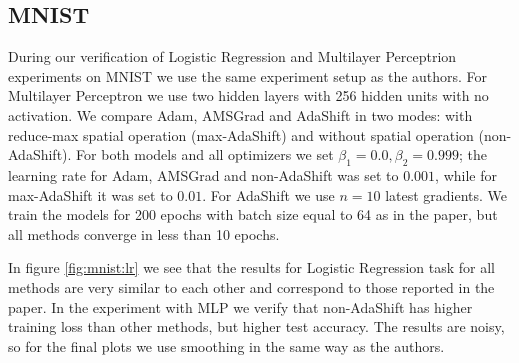 \documentclass{article} %
\begin{document}
\subsection{MNIST}
During our verification of Logistic Regression and
Multilayer Perceptrion experiments on MNIST we use the
same experiment setup as the authors.
For Multilayer Perceptron we use two hidden layers with 256 hidden units  with no activation. We compare Adam, AMSGrad and AdaShift in two modes: with reduce-max spatial operation (max-AdaShift) and without spatial operation (non-AdaShift). For both models and all optimizers we set $\beta_1=0.0, \beta_2=0.999$; the learning rate for Adam, AMSGrad and  non-AdaShift was set to $0.001$, while for max-AdaShift it  was set to $0.01$. For AdaShift we use $n = 10$ latest gradients.
We train the models for 200 epochs with batch size equal to 64 as in the paper, but all methods converge in less than 10 epochs.

In figure \ref{fig:mnist:lr} we see that the results for Logistic Regression task for all methods  are very similar to each other and correspond to those reported in the paper. In the experiment with MLP we verify that non-AdaShift has higher training loss than other methods, but higher test accuracy. The results are noisy, so for the final plots we use smoothing in the same way as the authors.
\end{document}
